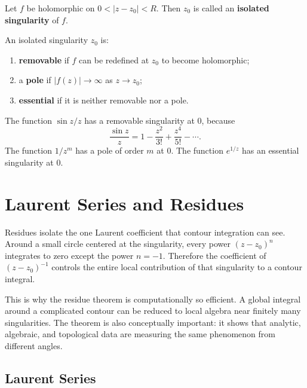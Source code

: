 \begin{definition}
Let $f$ be holomorphic on $0<|z-z_0|<R$. Then $z_0$ is called an \textbf{isolated singularity} of $f$.
\end{definition}

\begin{definition}
An isolated singularity $z_0$ is:
\begin{enumerate}
    \item \textbf{removable} if $f$ can be redefined at $z_0$ to become holomorphic;
    \item a \textbf{pole} if $|f(z)|\to\infty$ as $z\to z_0$;
    \item \textbf{essential} if it is neither removable nor a pole.
\end{enumerate}
\end{definition}



\begin{example}
The function $\sin z/z$ has a removable singularity at $0$, because
\[
    \frac{\sin z}{z}=1-\frac{z^2}{3!}+\frac{z^4}{5!}-\cdots.
\]
The function $1/z^m$ has a pole of order $m$ at $0$. The function $e^{1/z}$ has an essential singularity at $0$.
\end{example}

\section{Laurent Series and Residues}


Residues isolate the one Laurent coefficient that contour integration can see. Around a small circle centered at the singularity, every power $(z-z_0)^n$ integrates to zero except the power $n=-1$. Therefore the coefficient of $(z-z_0)^{-1}$ controls the entire local contribution of that singularity to a contour integral.

This is why the residue theorem is computationally so efficient. A global integral around a complicated contour can be reduced to local algebra near finitely many singularities. The theorem is also conceptually important: it shows that analytic, algebraic, and topological data are measuring the same phenomenon from different angles.

\subsection{Laurent Series}


